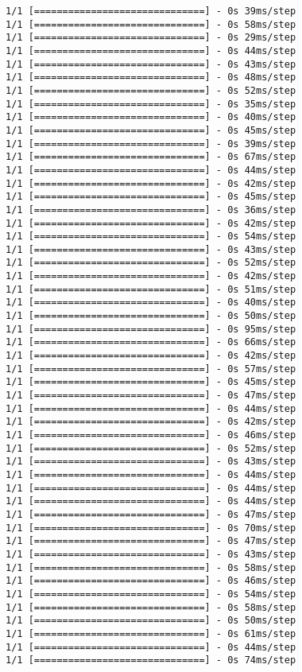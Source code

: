 \documentclass[11pt]{article}
\begin{document}
\begin{Verbatim}[commandchars=\\\{\}]
1/1 [==============================] - 0s 39ms/step
1/1 [==============================] - 0s 58ms/step
1/1 [==============================] - 0s 29ms/step
1/1 [==============================] - 0s 44ms/step
1/1 [==============================] - 0s 43ms/step
1/1 [==============================] - 0s 48ms/step
1/1 [==============================] - 0s 52ms/step
1/1 [==============================] - 0s 35ms/step
1/1 [==============================] - 0s 40ms/step
1/1 [==============================] - 0s 45ms/step
1/1 [==============================] - 0s 39ms/step
1/1 [==============================] - 0s 67ms/step
1/1 [==============================] - 0s 44ms/step
1/1 [==============================] - 0s 42ms/step
1/1 [==============================] - 0s 45ms/step
1/1 [==============================] - 0s 36ms/step
1/1 [==============================] - 0s 42ms/step
1/1 [==============================] - 0s 54ms/step
1/1 [==============================] - 0s 43ms/step
1/1 [==============================] - 0s 52ms/step
1/1 [==============================] - 0s 42ms/step
1/1 [==============================] - 0s 51ms/step
1/1 [==============================] - 0s 40ms/step
1/1 [==============================] - 0s 50ms/step
1/1 [==============================] - 0s 95ms/step
1/1 [==============================] - 0s 66ms/step
1/1 [==============================] - 0s 42ms/step
1/1 [==============================] - 0s 57ms/step
1/1 [==============================] - 0s 45ms/step
1/1 [==============================] - 0s 47ms/step
1/1 [==============================] - 0s 44ms/step
1/1 [==============================] - 0s 42ms/step
1/1 [==============================] - 0s 46ms/step
1/1 [==============================] - 0s 52ms/step
1/1 [==============================] - 0s 43ms/step
1/1 [==============================] - 0s 44ms/step
1/1 [==============================] - 0s 44ms/step
1/1 [==============================] - 0s 44ms/step
1/1 [==============================] - 0s 47ms/step
1/1 [==============================] - 0s 70ms/step
1/1 [==============================] - 0s 47ms/step
1/1 [==============================] - 0s 43ms/step
1/1 [==============================] - 0s 58ms/step
1/1 [==============================] - 0s 46ms/step
1/1 [==============================] - 0s 54ms/step
1/1 [==============================] - 0s 58ms/step
1/1 [==============================] - 0s 50ms/step
1/1 [==============================] - 0s 61ms/step
1/1 [==============================] - 0s 44ms/step
1/1 [==============================] - 0s 74ms/step

\end{Verbatim}
\end{document}
